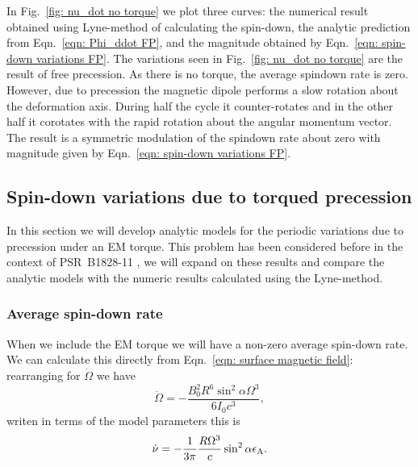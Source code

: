 \documentclass[../full_thesis/full_thesis.tex]{subfiles}
\begin{document}
In Fig.~\ref{fig: nu_dot no torque} we plot three curves: the numerical
result obtained using Lyne-method of calculating the spin-down, the analytic
prediction from Eqn.~\eqref{eqn: Phi_ddot FP}, and the magnitude obtained by
Eqn.~\eqref{eqn: spin-down variations FP}.
The variations seen in Fig.~\ref{fig: nu_dot no torque} are the result of
free precession. As there is no torque, the average spindown rate is zero. However,
due to precession the magnetic dipole performs a slow rotation about the
deformation axis. During half the cycle it counter-rotates and in the other
half it corotates with the rapid rotation about the angular momentum vector.
The result is a symmetric modulation of the spindown rate about zero with magnitude
given by Eqn.~\eqref{eqn: spin-down variations FP}.

\subsection{Spin-down variations due to torqued precession}
In this section we will develop analytic models for the periodic variations
due to precession under an EM torque. This problem has been considered before
in the context of PSR~B1828-11 \citep{Jones2001, Link2001, Akgun2006}, we will
expand on these results and compare the analytic models with the numeric
results calculated using the Lyne-method.

\subsubsection{Average spin-down rate}
When we include the EM torque we will have a non-zero average spin-down rate.
We can calculate this directly from Eqn.~\eqref{eqn: surface magnetic field}:
rearranging for $\dot{\Omega}$ we have
\begin{equation}
    \dot{\Omega} = -\frac{B_{0}^{2}R^{6} \sin^{2}\alpha \Omega^{3}}{6I_{0}c^{3}},
\end{equation}
writen in terms of the model parameters this is
\begin{equation}
\dot{\nu} = -\frac{1}{3\pi}\frac{R \Omega^{3}}{c} \sin^{2}\alpha \epsilon_{\mathrm{A}}.
\end{equation}
\end{document}
